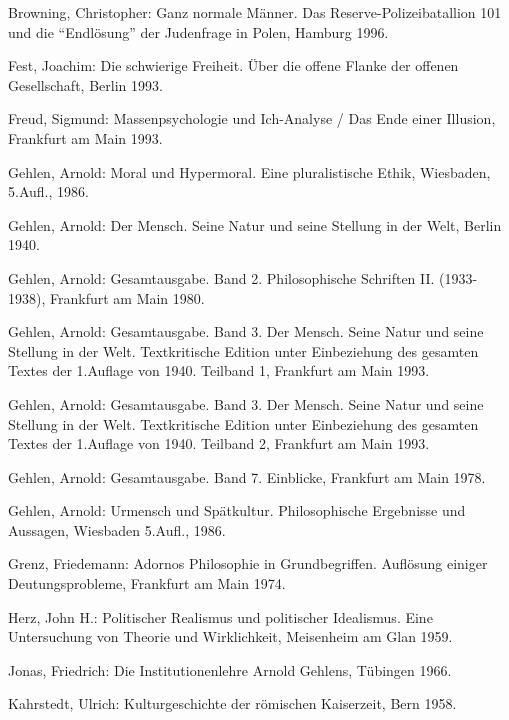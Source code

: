 \documentclass[12pt,a4paper]{article}
\begin{document}
\begin{thebibliography}{99}

 Brow\-ning, Christopher: Ganz normale Män\-ner. Das
Re\-ser\-ve-\-Polizei\-batallion 101 und die "`Endlösung"' der Judenfrage in
Polen, Hamburg 1996.

 Fest, Joachim: Die schwierige Freiheit. Über
die offene Flanke der offenen Gesellschaft, Berlin 1993.

 Freud, Sigmund: Massenpsychologie und Ich-Analyse /
Das Ende einer Illusion, Frankfurt am Main 1993.

 Gehlen, Arnold: Moral und Hypermoral. Eine
  pluralistische Ethik, Wiesbaden, 5.Aufl., 1986.

 Gehlen, Arnold: Der Mensch. Seine Natur und seine
  Stellung in der Welt, Berlin 1940.

 Gehlen, Arnold: Gesamtausgabe. Band 2. Philosophische
Schriften II. (1933-1938), Frankfurt am Main 1980.

 Gehlen, Arnold: Gesamtausgabe. Band 3. Der Mensch. Seine
Natur und seine Stellung in der Welt. Textkritische Edition unter
Einbeziehung des gesamten Textes der 1.Auflage von 1940. Teilband 1,
Frankfurt am Main 1993.

 Gehlen, Arnold: Gesamtausgabe. Band 3. Der Mensch. Seine
Natur und seine Stellung in der Welt. Textkritische Edition unter
Einbeziehung des gesamten Textes der 1.Auflage von 1940. Teilband 2,
Frankfurt am Main 1993.

 Gehlen, Arnold: Gesamtausgabe. Band 7. Einblicke, Frankfurt
am Main 1978. %

 Gehlen, Arnold: Urmensch und Spätkultur. Philosophische
Ergebnisse und Aussagen, Wiesbaden 5.Aufl., 1986.

 Grenz, Friedemann: Adornos Philosophie in
Grundbegriffen. Auflösung einiger Deutungsprobleme, Frankfurt am Main
1974. %

 Herz, John H.: Politischer Realismus und politischer
Idealismus. Eine Untersuchung von Theorie und Wirklichkeit, Meisenheim am
Glan 1959.

 Jonas, Friedrich: Die Institutionenlehre Arnold Gehlens,
Tübingen 1966.

 Kahrstedt, Ulrich: Kulturgeschichte der römischen
Kaiserzeit, Bern 1958.


\end{thebibliography}
\end{document}
